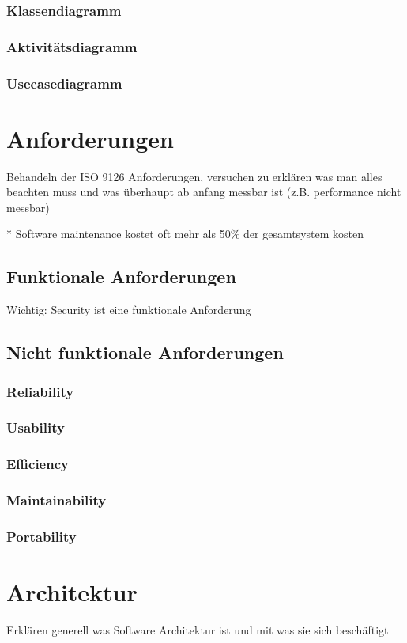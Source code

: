 \documentclass[Master,MSE,german]{twbook}
\begin{document}
\subsection{Klassendiagramm}
\subsection{Aktivitätsdiagramm}
\subsection{Usecasediagramm}


\chapter{Anforderungen}
Behandeln der ISO 9126 Anforderungen, versuchen zu erklären was man alles beachten muss und was überhaupt ab anfang messbar ist (z.B. performance nicht messbar)

* Software maintenance kostet oft mehr als 50\% der gesamtsystem kosten \cite[S. 71-84]{maincost}

\section{Funktionale Anforderungen}
Wichtig: Security ist eine funktionale Anforderung

\section{Nicht funktionale Anforderungen}
\subsection{Reliability}
\subsection{Usability}
\subsection{Efficiency}
\subsection{Maintainability}
\subsection{Portability}

\chapter{Architektur}
Erklären generell was Software Architektur ist und mit was sie sich beschäftigt
\end{document}
